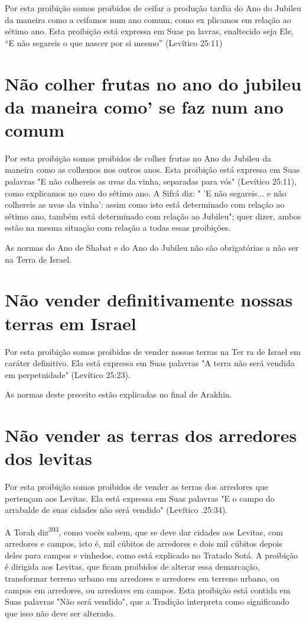 Por esta proibição somos proibidos de ceifar a produção tardia do Ano do
Jubileu da maneira como a ceifamos num ano comum, como ex plicamos em
relação ao sétimo ano. Esta proibição está expressa em Suas pa lavras,
enaltecido seja Ele, ``E não segareis o que nascer por si mesmo''
(Leví­tico 25:11)

\section{Não colher frutas no ano do jubileu da maneira como' se faz num ano comum}

Por esta proibição somos proibidos de colher frutas no Ano do Jubileu da
maneira como as colhemos nos outros anos. Esta proibição está expressa
em Suas palavras "E não colhereis as uvas da vinha, separadas para vós"
(Levítico 25:11), como explicamos no caso do sétimo ano. A Sifrá diz: "
'E não segareis... e não colhereis as uvas da vinha': assim como isto
está determinado com relação ao sétimo ano, também está determinado com
rela­ção ao Jubileu"; quer dizer, ambos estão na mesma situação com
relação a todas essas proibições.


As normas do Ano de Shabat e do Ano do Jubileu não são obrigató­rias a
não ser na Terra de Israel.


\section{Não vender definitivamente nossas terras em Israel}


Por esta proibição somos proibidos de vender nossas terras na Ter ra de
Israel em caráter definitivo. Ela está expressa em Suas palavras "A
terra não será vendida em perpetuidade" (Levítico 25:23).

As normas deste preceito estão explicadas no final de Arakhin.

\section{Não vender as terras dos arredores dos levitas}

Por esta proibição somos proibidos de vender as terras dos arredo­res
que pertençam aos Levitas. Ela está expressa em Suas palavras "E o campo
do arrabalde de suas cidades não será vendido" (Levítico .25:34).

A Torah diz\textsuperscript{393}, como vocès sabem, que se deve dar
cidades aos Le­vitas, com arredores e campos, isto é, mil cúbitos de
arredores e dois mil cúbi­tos depois deles para campos e vinhedos, como
está explicado no Tratado So­tá. A proibição é dirigida aos Levitas, que
ficam proibidos de alterar essa de­marcação, transformar terreno urbano
em arredores e arredores em terreno ur­bano, ou campos em arredores, ou
arredores em campos. Esta proibição está contida em Suas palavras "Não
será vendido", que a Tradição interpreta como significando que isso não
deve ser alterado.

